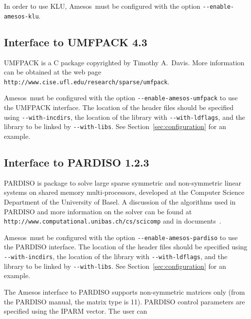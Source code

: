 \documentclass[11pt]{SANDreport}
\newcommand{\amesos}{{\sc Amesos}}
\begin{document}
In order to use KLU, \amesos\ must be configured with the option
\verb!--enable-amesos-klu!.

\subsection{Interface to UMFPACK 4.3}
\label{sec:umfpack}

UMFPACK is a C package copyrighted by Timothy A.~Davis. More information
can be obtained at the web page
\verb!http://www.cise.ufl.edu/research/sparse/umfpack!.

\amesos\ must be configured with the option
\verb!--enable-amesos-umfpack! to use the UMFPACK interface.  The location of the header files should be
specified using \verb!--with-incdirs!, the location of the library with
\verb!--with-ldflags!, and the library to be linked by \verb!--with-libs!. See
Section~\ref{sec:configuration} for an example.

\subsection{Interface to PARDISO 1.2.3}
\label{sec:pardiso}

PARDISO is package to solve large sparse symmetric and non-symmetric linear
systems on shared memory multi-processors, developed at the Computer Science
Department of the University of Basel. A discussion of the algorithms used
in PARDISO and more information on the solver can be found at {\tt
  http://www.computational.unibas.ch/cs/scicomp} and in
  documents~\cite{oskl:04-etna,sg:04-fgcs}.

\amesos\ must be configured with the option
\verb!--enable-amesos-pardiso! to use the PARDISO interface.  
The location of the header files should be
specified using \verb!--with-incdirs!, the location of the library with
\verb!--with-ldflags!, and the library to be linked by \verb!--with-libs!. See
Section~\ref{sec:configuration} for an example.

The Amesos interface to PARDISO supports non-symmetric matrices only 
(from the PARDISO manual, the matrix type is 11). PARDISO control parameters
are specified using the IPARM vector. The user can 
  
\end{document}
